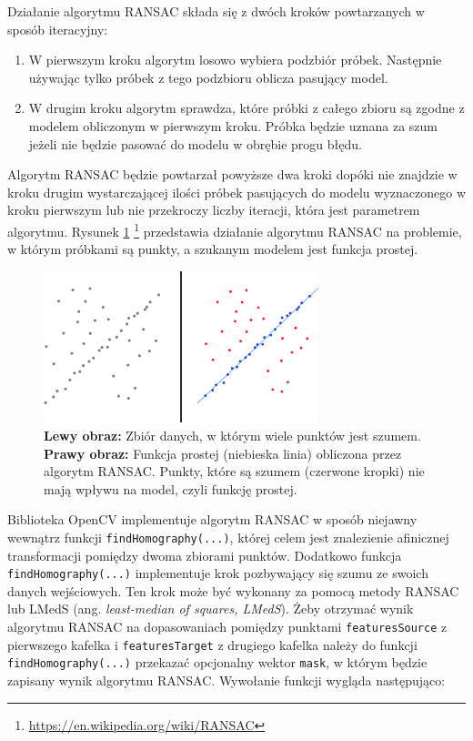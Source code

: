 Działanie algorytmu RANSAC składa się z dwóch kroków powtarzanych w sposób iteracyjny:

\begin{enumerate}
\item W pierwszym kroku algorytm losowo wybiera podzbiór próbek. Następnie używając tylko próbek z tego podzbioru oblicza pasujący model.
\item W drugim kroku algorytm sprawdza, które próbki z całego zbioru są zgodne z modelem obliczonym w pierwszym kroku. Próbka będzie uznana za szum jeżeli nie będzie pasować do modelu w obrębie progu błędu.
\end{enumerate}

Algorytm RANSAC będzie powtarzał powyższe dwa kroki dopóki nie znajdzie w kroku drugim wystarczającej ilości próbek pasujących do modelu wyznaczonego w kroku pierwszym lub nie przekroczy liczby iteracji, która jest parametrem algorytmu. Rysunek \ref{fig:proponowane_algorytmy:ransac} \footnote{\url{https://en.wikipedia.org/wiki/RANSAC}} przedstawia działanie algorytmu RANSAC na problemie, w którym próbkami są punkty, a szukanym modelem jest funkcja prostej.

\begin{figure}[H]
  \centering
  \includegraphics[width=8cm]{gfx/ransac}
  \caption{\textbf{Lewy obraz:} Zbiór danych, w którym wiele punktów jest szumem. \textbf{Prawy obraz:} Funkcja prostej (niebieska linia) obliczona przez algorytm RANSAC. Punkty, które są szumem (czerwone kropki) nie mają wpływu na model, czyli funkcję prostej.}
  \label{fig:proponowane_algorytmy:ransac}
\end{figure}

Biblioteka OpenCV implementuje algorytm RANSAC w sposób niejawny wewnątrz funkcji \texttt{findHomography(...)}, której celem jest znalezienie afinicznej transformacji pomiędzy dwoma zbiorami punktów. Dodatkowo funkcja \texttt{findHomography(...)} implementuje krok pozbywający się szumu ze swoich danych wejściowych. Ten krok może być wykonany za pomocą metody RANSAC lub LMedS (ang. \textit{least-median of squares, LMedS}). Żeby otrzymać wynik algorytmu RANSAC na dopasowaniach pomiędzy punktami \texttt{featuresSource} z pierwszego kafelka i \texttt{featuresTarget} z drugiego kafelka należy do funkcji \texttt{findHomography(...)} przekazać opcjonalny wektor \texttt{mask}, w którym będzie zapisany wynik algorytmu RANSAC. Wywołanie funkcji wygląda następująco:

